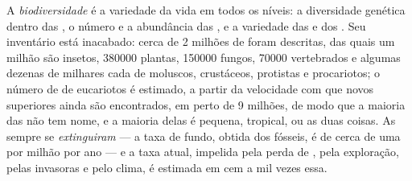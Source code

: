 \begin{definition}[Biodiversidade]\label{def:b1:classifying-biodiversity:biodiversity}
A \emph{biodiversidade} é a variedade da vida em todos os níveis: a
diversidade genética dentro das , o número e a abundância das
, e a variedade das  e dos . Seu
inventário está inacabado: cerca de \num{2} milhões de  foram
descritas, das quais um milhão são insetos, \num{380000} plantas,
\num{150000} fungos, \num{70000} vertebrados e algumas dezenas de
milhares cada de moluscos, crustáceos, protistas e procariotos; o
número de  de eucariotos é estimado, a partir da velocidade
com que novos  superiores ainda são encontrados, em perto de
\num{9} milhões, de modo que a maioria das  não tem nome, e a
maioria delas é pequena, tropical, ou as duas coisas. As 
sempre se \emph{extinguiram} --- a taxa de fundo, obtida dos fósseis,
é de cerca de uma  por milhão por ano --- e a taxa atual,
impelida pela perda de , pela exploração, pelas 
invasoras e pelo clima, é estimada em cem a mil vezes essa.
\end{definition}

